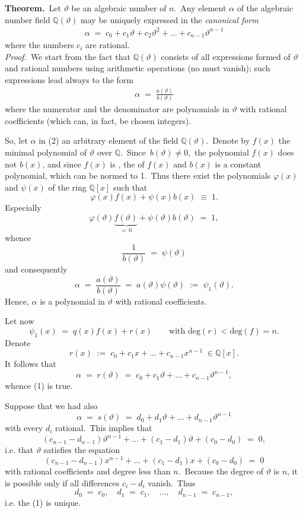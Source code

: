 \documentclass[12pt]{article}
\theoremstyle{definition}
\begin{document}

\textbf{Theorem.}\, Let $\vartheta$ be an algebraic number of  $n$.\, Any element $\alpha$ of the algebraic number field $\mathbb{Q}(\vartheta)$ may be uniquely expressed in the \emph{canonical form}
\begin{align}
\alpha \;=\; c_0+c_1\vartheta+c_2\vartheta^2+\ldots+c_{n-1}\vartheta^{n-1}
\end{align}
where the numbers $c_i$ are rational.\\

\emph{Proof.}\, We start from the fact that $\mathbb{Q}(\vartheta)$ consists of all expressions formed of $\vartheta$ and rational numbers using arithmetic operations (no  must vanish); such expressions lead always to the form
\begin{align}
\alpha \;=\; \frac{a(\vartheta)}{b(\vartheta)}
\end{align}
where the numerator and the denominator are polynomials in $\vartheta$ with rational coefficients (which can, in fact, be chosen integers).

So, let $\alpha$ in (2) an arbitrary element of the field $\mathbb{Q}(\vartheta)$.\, Denote by $f(x)$ the minimal polynomial of $\vartheta$ over $\mathbb{Q}$.\, Since\, $b(\vartheta) \neq 0$,\, the polynomial $f(x)$ does not  $b(x)$, and since $f(x)$ is , the  of $f(x)$ and $b(x)$ is a constant polynomial, which can be normed to 1.\, Thus there exist the polynomials $\varphi(x)$ and $\psi(x)$ of the ring $\mathbb{Q}[x]$ such that
$$\varphi(x)f(x)+\psi(x)b(x) \;\equiv\; 1.$$
Especially
$$\varphi(\vartheta)\underbrace{f(\vartheta)}_{=\, 0}+\psi(\vartheta)b(\vartheta) \;=\; 1,$$
whence
$$\frac{1}{b(\vartheta)} \;=\; \psi(\vartheta)$$
and consequently
$$\alpha \;=\; \frac{a(\vartheta)}{b(\vartheta)} \;=\; a(\vartheta)\psi(\vartheta) \;:=\; \psi_1(\vartheta).$$
Hence, $\alpha$ is a polynomial in $\vartheta$ with rational coefficients.

Let now
$$\psi_1(x) \;=\; q(x)f(x)+r(x) \qquad \textrm{with  }\mbox{deg}(r) < \mbox{deg}(f) = n.$$
Denote
$$r(x) \;:=\; c_0+c_1x+\ldots+c_{n-1}x^{n-1}\; \in \mathbb{Q}[x].$$
It follows that 
$$\alpha \;=\; r(\vartheta) \;=\; c_0+c_1\vartheta+\ldots+c_{n-1}\vartheta^{n-1},$$
whence (1) is true.

Suppose that we had also
$$\alpha \;=\; s(\vartheta) \;=\; d_0+d_1\vartheta+\ldots+d_{n-1}\vartheta^{n-1}$$
with every $d_i$ rational.\, This implies that
$$(c_{n-1}-d_{n-1})\vartheta^{n-1}+\ldots+(c_1-d_1)\vartheta+(c_0-d_0) \;=\; 0,$$
i.e. that $\vartheta$ satisfies the equation
$$(c_{n-1}-d_{n-1})x^{n-1}+\ldots+(c_1-d_1)x+(c_0-d_0) \;=\; 0$$
with rational coefficients and degree less than $n$.\, Because the degree of $\vartheta$ is $n$, it is possible only if all differences $c_i\!-\!d_i$ vanish.\, Thus
$$d_0 \;=\; c_0, \quad d_1 \;=\; c_1, \quad\ldots, \quad d_{n-1} \;=\; c_{n-1},$$
i.e. the  (1) is unique.\\
\end{document}
